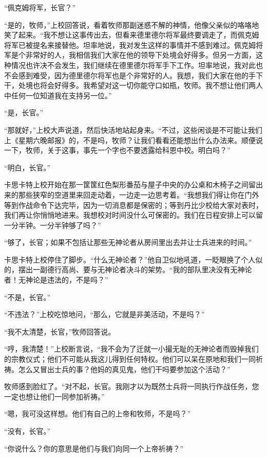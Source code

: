     “佩克姆将军，长官？”

    “是的，牧师，”上校回答说，看着牧师那副迷惑不解的神情，他像父亲似的咯咯地笑了起来。“我不想让这事传出去，但看来德里德尔将军最终要调走了，而佩克姆将军已被提名来接替他。坦率地说，我对发生这样的事情并不感到难过。佩克姆将军是个非常好的人，我相信我们大家在他的领导下处境会好得多。但另一方面，这种情况也许决不会发生，我们继续在德里德尔将军手下工作。坦率地说，我对此也不会感到难受，因为德里德尔将军也是个非常好的人。我想，我们大家在他的手下干，处境也将会好得多。我希望对这一切你能守口如瓶，牧师。我不想让他们两人中任何一位知道我在支持另一位。”

    “是，长官。”

    “那就好，”上校大声说道，然后快活地站起身来。“不过，这些闲谈是不可能让我们上《星期六晚邮报》的，不是吗，牧师？让我们看看还能想出什么办法来。顺便说一下，牧师，关于这事，事先一个字也不要透露给科恩中校。明白吗？”

    “明白，长官。”

    卡思卡特上校开始在那一筐筐红色梨形番茄与屋子中央的办公桌和木椅子之间留出来的那些狭窄的空道里来回走动着，一边走一边思考着。“我想我们得让你在门外等到作战命令下达完毕，因为一切消息都是保密的；等到丹比少校给大家对表时，我们再让你悄悄地进来。我想校对时间没什么可保密的。我们在日程安排上可以留一分半钟。一分半钟够了吗？”

    “够了，长官；如果不包括让那些无神论者从房间里出去并让士兵进来的时间。”

    卡思卡特上校停住了脚步。“什么无神论者？”他自卫似地吼道，一眨眼换了个人似的，摆出一副德行高尚、要与无神论者决斗的架势。“我的部队里决没有无神论者！无神论是违法的，不是吗？”

    “不是，长官。”

    “不违法？”上校吃惊地问，“那么，它就是非美活动，不是吗？”

    “我不太清楚，长官，”牧师回答说。

    “哼，我清楚！”上校断言说，“我不会为了迁就一小撮无耻的无神论者而毁掉我们的宗教仪式；他们不可能从我这儿得到任何特权。他们可以呆在原地和我们一同祈祷。怎么又冒出士兵的事？他妈的真见鬼，他们干吗要参加这个活动？”

    牧师感到脸红了。“对不起，长官。我刚才以为既然士兵将一同执行作战任务，您一定也想让他们一同参加祈祷。”

    “嗯，我可没这样想。他们有自己的上帝和牧师，不是吗？”

    “没有，长官。”

    “你说什么？你的意思是他们与我们向同一个上帝祈祷？”

